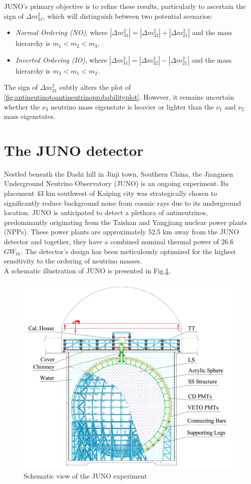 JUNO's primary objective is to refine these results, particularly to ascertain the sign of $\Delta m_{31}^2$, which will distinguish between two potential scenarios:
\begin{itemize}
	\item \textit{Normal Ordering (NO)}, where $\left|\Delta m_{31}^2\right|=\left|\Delta m_{32}^2\right|+\left|\Delta m_{21}^2\right|$ and the mass hierarchy is $m_1<m_2<m_3$,
	\item \textit{Inverted Ordering (IO)}, where $\left|\Delta m_{31}^2\right|=\left|\Delta m_{32}^2\right|-\left|\Delta m_{21}^2\right|$ and the mass hierarchy is $m_3<m_1<m_2$.
\end{itemize}
The sign of $\Delta m_{31}^2$ subtly alters the plot of \ref{fig:antineutinotoantineutrinoprobabilityplot}. However, it remains uncertain whether the $\nu_3$ neutrino mass eigenstate is heavier or lighter than the $\nu_1$ and $\nu_2$ mass eigenstates.


\section{The JUNO detector}

Nestled beneath the Dashi hill in Jinji town, Southern China, the Jiangmen Underground Neutrino Observatory (JUNO) is an ongoing experiment. Its placement 43 km southwest of Kaiping city was strategically chosen to significantly reduce background noise from cosmic rays due to its underground location. JUNO is anticipated to detect a plethora of antineutrinos, predominantly originating from the Taishan and Yangjiang nuclear power plants (NPPs). These power plants are approximately 52.5 km away from the JUNO detector and together, they have a combined nominal thermal power of 26.6 $GW_{th}$. The detector's design has been meticulously optimized for the highest sensitivity to the ordering of neutrino masses.\\

A schematic illustration of JUNO is presented in Fig.\ref{fig:junoschemeexperiment}.


\begin{figure}[h]
	\centering
	\includegraphics[width=0.6\linewidth]{Images/juno_scheme_experiment}
	\caption[JUNO scheme experiment]{Schematic view of the JUNO experiment}
	\label{fig:junoschemeexperiment}
\end{figure}


